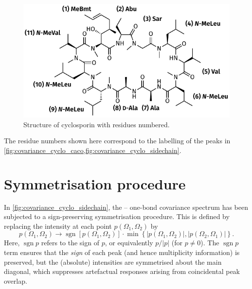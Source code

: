 \documentclass[a4paper,12pt]{article}
\DeclareMathOperator*{\sgn}{sgn}
\newcommand{\carbon}{\ch{^{13}C}}
\begin{document}
\begin{refsection}
\begin{figure}[ht]
    \centering
    \includegraphics[draft=false,scale=1.2]{figures/cyclosporin.pdf}%
    \caption[Structure of cyclosporin]{
        Structure of cyclosporin with residues numbered.
    }
    \label{fig:samples_cyclosporin}
\end{figure}

The residue numbers shown here correspond to the labelling of the peaks in \cref{fig:covariance_cyclo_caco,fig:covariance_cyclo_sidechain}.

\section{Symmetrisation procedure}
\label{sec:si_symmetrisation}

In \cref{fig:covariance_cyclo_sidechain}, the \carbon{}--\carbon{} one-bond covariance spectrum has been subjected to a sign-preserving symmetrisation procedure.
This is defined by replacing the intensity at each point $p(\Omega_1, \Omega_2)$ by
\begin{equation}
    \label{eq:covariance_symmetrisation}
    p(\Omega_1, \Omega_2) \to \sgn[p(\Omega_1, \Omega_2)] \cdot \min\left\{|p(\Omega_1, \Omega_2)|, |p(\Omega_2, \Omega_1)|\right\}.
\end{equation}
Here, $\sgn{p}$ refers to the sign of $p$, or equivalently $p / |p|$ (for $p \neq 0$).
The $\sgn{p}$ term ensures that the \textit{sign} of each peak (and hence multiplicity information) is preserved, but the (absolute) intensities are symmetrised about the main diagonal, which suppresses artefactual responses arising from coincidental peak overlap.


\end{refsection}
\end{document}
